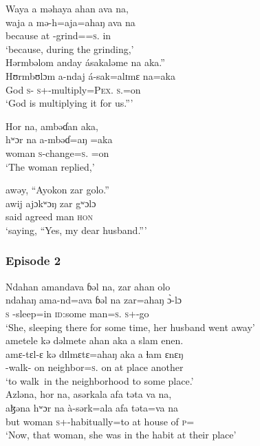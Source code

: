 \medskip
  Waya  a  məhaya  ahan  ava  na,\\
\gll waja   a    mə-h=aja=ahaŋ ava na\\
because  at   {\NOM}{}-grind={\PLU}=\textsc{s}.{\POSS}   in   {\PSP}\\
\glt ‘because, during the grinding,’\\
\clearpage
\medskip
 Hərmbəlom  anday  ásakaləme  na  aka.”\\
\gll Hʊrmbʊlɔm   a-ndaj    á-sak=alɪmɛ     na=aka\\
God                \textsc{s}-{\PRG}  \textsc{s}+{\IFV}-multiply=\textsc{Pex}.{\IO}  \textsc{s}.{\DO}=on \\
\glt ‘God is multiplying it for us.”’\\
\z

\ea   Hor  na,  ambəɗan  aka,   \\
\gll hʷɔr na a-mbəɗ=aŋ =aka\\
woman {\PSP}  \textsc{s}-change=\textsc{s}.{\IO}    =on\\
\glt ‘The woman replied,’\\
\z

\ea  awəy,  “Ayokon  zar  golo.”\\
\gll awij    ajɔkʷɔŋ   zar  gʷɔlɔ\\
said   agreed man  \textsc{hon}\\
\glt ‘saying, “Yes, my dear husband.”’
\z 

\subsubsection*{Episode 2}
\ea  Ndahan  amandava  ɓəl  na, zar  ahan  olo\\
\gll ndahaŋ  ama-nd=ava   ɓəl   na  zar=ahaŋ      \`ɔ{}-lɔ\\
\textsc{s}         {\DEP}-sleep=in    \textsc{id}:some  {\PSP}  man=\textsc{s}.{\POSS}  \textsc{s}+{\PFV}-go  \\
\glt ‘She, sleeping there for some time, her husband went away’\\

\medskip
 ametele  kə  dəlmete  ahan  aka  a  slam  enen.\\
\gll amɛ-tɛl-ɛ     kə  dɪlmɛtɛ=ahaŋ      aka   a  ɬam  ɛnɛŋ\\
{\DEP}-walk-{\CL}  on   neighbor=\textsc{s}.{\POSS}  on  at place another\\
\glt ‘to walk~in the neighborhood to some place.’ \\
\z
\ea  Azləna,  hor  na,  asərkala  afa  təta  va  na,\\
 \gll aɮəna  hʷɔr   na à-sərk=ala afa təta=va na\\
 but  woman  {\PSP}  \textsc{s}+{\PFV}-{habitually}=to     {at house of}  \textsc{p}={\PRF}  {\PSP}\\
 \glt ‘Now, that woman, she was in the habit at their place’\\
 
